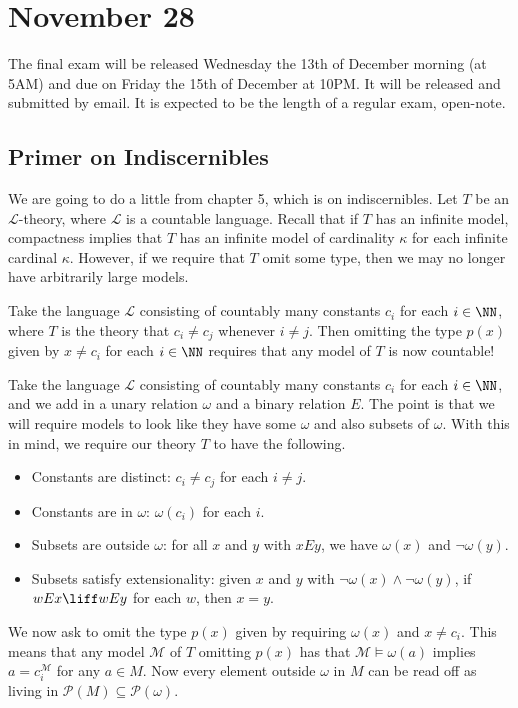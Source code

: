 \documentclass[../notes.tex]{subfiles}
\begin{document}
\section{November 28}

The final exam will be released Wednesday the 13th of December morning (at 5AM) and due on Friday the 15th of December at 10PM. It will be released and submitted by email. It is expected to be the length of a regular exam, open-note.

\subsection{Primer on Indiscernibles} \label{subsec:motivate-indisc}
We are going to do a little from chapter 5, which is on indiscernibles. Let $T$ be an $\mathcal L$-theory, where $\mathcal L$ is a countable language. Recall that if $T$ has an infinite model, compactness implies that $T$ has an infinite model of cardinality $\kappa$ for each infinite cardinal $\kappa$. However, if we require that $T$ omit some type, then we may no longer have arbitrarily large models.
\begin{example}
	Take the language $\mathcal L$ consisting of countably many constants $c_i$ for each $i\in\NN$, where $T$ is the theory that $c_i\ne c_j$ whenever $i\ne j$. Then omitting the type $p(x)$ given by $x\ne c_i$ for each $i\in\NN$ requires that any model of $T$ is now countable!
\end{example}
\begin{example}
	Take the language $\mathcal L$ consisting of countably many constants $c_i$ for each $i\in\NN$, and we add in a unary relation $\omega$ and a binary relation $E$. The point is that we will require models to look like they have some $\omega$ and also subsets of $\omega$. With this in mind, we require our theory $T$ to have the following.
	\begin{itemize}
		\item Constants are distinct: $c_i\ne c_j$ for each $i\ne j$.
		\item Constants are in $\omega$: $\omega(c_i)$ for each $i$.
		\item Subsets are outside $\omega$: for all $x$ and $y$ with $xEy$, we have $\omega(x)$ and $\lnot\omega(y)$.
		\item Subsets satisfy extensionality: given $x$ and $y$ with $\lnot\omega(x)\land\lnot\omega(y)$, if $wEx\liff wEy$ for each $w$, then $x=y$.
	\end{itemize}
	We now ask to omit the type $p(x)$ given by requiring $\omega(x)$ and $x\ne c_i$. This means that any model $\mathcal M$ of $T$ omitting $p(x)$ has that $\mathcal M\models\omega(a)$ implies $a=c_i^\mathcal M$ for any $a\in M$. Now every element outside $\omega$ in $M$ can be read off as living in $\mathcal P(M)\subseteq\mathcal P(\omega)$.
\end{example}
\end{document}

